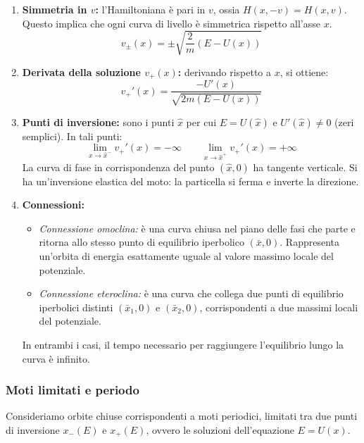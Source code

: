 \begin{enumerate}
    \item \textbf{Simmetria in $v$:} l'Hamiltoniana è pari in $v$, ossia $H(x,-v)=H(x,v)$. Questo implica che ogni curva di livello è simmetrica rispetto all'asse $x$.
    \begin{equation}
        v_\pm(x) = \pm \sqrt{ \frac{2}{m}(E - U(x)) }
    \end{equation}

    \item \textbf{Derivata della soluzione $v_+(x)$:} derivando rispetto a $x$, si ottiene:
    \begin{equation}
        v_+'(x) = \frac{-U'(x)}{ \sqrt{2m(E - U(x))} }
    \end{equation}
    
    \item \textbf{Punti di inversione:} sono i punti $\hat{x}$ per cui $E = U(\hat{x})$ e $U'(\hat{x}) \neq 0$ (zeri semplici). In tali punti:
    \begin{equation}
        \lim_{x \to \hat{x}^-} v_+'(x) = -\infty \qquad \lim_{x \to \hat{x}^+} v_+'(x) = +\infty
    \end{equation}
    La curva di fase in corrispondenza del punto $(\hat{x}, 0)$ ha tangente verticale. Si ha un'inversione elastica del moto: la particella si ferma e inverte la direzione.
    \item \textbf{Connessioni:} 
    \begin{itemize}
        \item \textit{Connessione omoclina:} è una curva chiusa nel piano delle fasi che parte e ritorna allo stesso punto di equilibrio iperbolico $(\bar{x}, 0)$.
         Rappresenta un'orbita di energia esattamente uguale al valore massimo locale del potenziale.
        \item \textit{Connessione eteroclina:} è una curva che collega due punti di equilibrio iperbolici distinti $(\bar{x}_1,0)$ e $(\bar{x}_2,0)$,
         corrispondenti a due massimi locali del potenziale.
    \end{itemize}
    In entrambi i casi, il tempo necessario per raggiungere l'equilibrio lungo la curva è infinito.

\end{enumerate}

\subsubsection{Moti limitati e periodo}
Consideriamo orbite chiuse corrispondenti a moti periodici, limitati tra due punti di inversione $x_-(E)$ e $x_+(E)$, 
ovvero le soluzioni dell'equazione $E = U(x)$.

